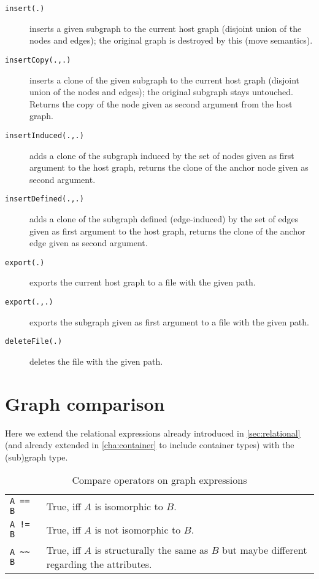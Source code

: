 \begin{description}
\item[\texttt{insert(.)}] inserts a given subgraph to the current host graph (disjoint union of the nodes and edges); the original graph is destroyed by this (move semantics).
\item[\texttt{insertCopy(.,.)}] inserts a clone of the given subgraph to the current host graph (disjoint union of the nodes and edges); the original subgraph stays untouched. Returns the copy of the node given as second argument from the host graph.
\item[\texttt{insertInduced(.,.)}] adds a clone of the subgraph induced by the set of nodes given as first argument to the host graph, returns the clone of the anchor node given as second argument.
\item[\texttt{insertDefined(.,.)}] adds a clone of the subgraph defined (edge-induced) by the set of edges given as first argument to the host graph, returns the clone of the anchor edge given as second argument.
\item[\texttt{export(.)}] exports the current host graph to a file with the given path.
\item[\texttt{export(.,.)}] exports the subgraph given as first argument to a file with the given path.
\item[\texttt{deleteFile(.)}] deletes the file with the given path.
\end{description}


\pagebreak %
\section{Graph comparison}\label{sec:relationalgraph}

Here we extend the relational expressions already introduced in \ref{sec:relational} (and already extended in \ref{cha:container} to include container types) with the (sub)graph type.

\begin{table}[htbp]
  \centering
  \begin{tabularx}{\linewidth}{|l|X|} \hline
    \texttt{A == B} & True, iff $A$ is isomorphic to $B$. \\
    \texttt{A != B} & True, iff $A$ is not isomorphic to $B$. \\
    \texttt{A \textasciitilde\textasciitilde{ } B} & True, iff $A$ is structurally the same as $B$ but maybe different regarding the attributes. \\ \hline
  \end{tabularx}
  \caption{Compare operators on graph expressions}
  \label{compandgraph}
\end{table}

